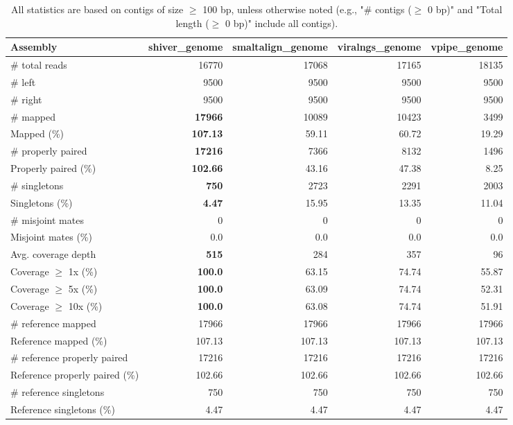 \documentclass[12pt,a4paper]{article}
\begin{document}
\begin{table}[ht]
\begin{center}
\caption{All statistics are based on contigs of size $\geq$ 100 bp, unless otherwise noted (e.g., "\# contigs ($\geq$ 0 bp)" and "Total length ($\geq$ 0 bp)" include all contigs).}
\begin{tabular}{|l*{4}{|r}|}
\hline
Assembly & shiver\_genome & smaltalign\_genome & viralngs\_genome & vpipe\_genome \\ \hline
\# total reads & 16770 & 17068 & 17165 & 18135 \\ \hline
\# left & 9500 & 9500 & 9500 & 9500 \\ \hline
\# right & 9500 & 9500 & 9500 & 9500 \\ \hline
\# mapped & {\bf 17966} & 10089 & 10423 & 3499 \\ \hline
Mapped (\%) & {\bf 107.13} & 59.11 & 60.72 & 19.29 \\ \hline
\# properly paired & {\bf 17216} & 7366 & 8132 & 1496 \\ \hline
Properly paired (\%) & {\bf 102.66} & 43.16 & 47.38 & 8.25 \\ \hline
\# singletons & {\bf 750} & 2723 & 2291 & 2003 \\ \hline
Singletons (\%) & {\bf 4.47} & 15.95 & 13.35 & 11.04 \\ \hline
\# misjoint mates & 0 & 0 & 0 & 0 \\ \hline
Misjoint mates (\%) & 0.0 & 0.0 & 0.0 & 0.0 \\ \hline
Avg. coverage depth & {\bf 515} & 284 & 357 & 96 \\ \hline
Coverage $\geq$ 1x (\%) & {\bf 100.0} & 63.15 & 74.74 & 55.87 \\ \hline
Coverage $\geq$ 5x (\%) & {\bf 100.0} & 63.09 & 74.74 & 52.31 \\ \hline
Coverage $\geq$ 10x (\%) & {\bf 100.0} & 63.08 & 74.74 & 51.91 \\ \hline
\# reference mapped & 17966 & 17966 & 17966 & 17966 \\ \hline
Reference mapped (\%) & 107.13 & 107.13 & 107.13 & 107.13 \\ \hline
\# reference properly paired & 17216 & 17216 & 17216 & 17216 \\ \hline
Reference properly paired (\%) & 102.66 & 102.66 & 102.66 & 102.66 \\ \hline
\# reference singletons & 750 & 750 & 750 & 750 \\ \hline
Reference singletons (\%) & 4.47 & 4.47 & 4.47 & 4.47 \\ \hline

\end{tabular}
\end{center}
\end{table}
\end{document}
